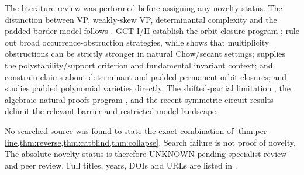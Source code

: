 \documentclass[11pt]{article}
\theoremstyle{definition}
\theoremstyle{remark}
\newcommand{\status}[1]{\textsf{#1}}
\begin{document}
The literature review was performed before assigning any novelty status.
The distinction between VP, weakly-skew VP, determinantal complexity and the
padded border model follows \cite{BlaserIkenmeyer2025}.  GCT
I/II establish the orbit-closure program \cite{MulmuleySohoni2001,MulmuleySohoni2008};
\cite{IP2017,BIP2019} rule out broad occurrence-obstruction strategies,
while \cite{DIP2020} shows that multiplicity obstructions can be strictly
stronger in natural Chow/secant settings; \cite{BI2017} supplies the polystability/support criterion and fundamental
invariant context; \cite{Kumar2013} and \cite{HuttenhainLairez2016} constrain
claims about determinant and padded-permanent orbit closures; and
\cite{KadishLandsberg2014} studies padded polynomial varieties directly.
The shifted-partial limitation \cite{ELSW2016}, the algebraic-natural-proofs
program \cite{GKSS2017}, and the recent symmetric-circuit results
\cite{DawarWilsenach2025,DPS2026,DwivediPagoSeppelt2026} delimit the relevant
barrier and restricted-model landscape.

No searched source was found to state the exact combination of
\cref{thm:per-line,thm:reverse,thm:catblind,thm:collapse}.  Search failure is
not proof of novelty.  The absolute novelty status is therefore
\status{UNKNOWN} pending specialist review and peer review.  Full titles, years,
DOIs and URLs are listed in .
\end{document}
